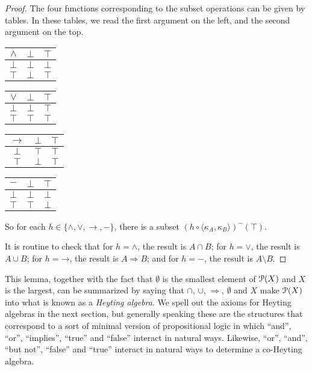 \begin{lemma}
\begin{proof}
		The four functions corresponding to the subset operations can be given by tables. In these tables, we read the first argument on the left, and the second argument on the top.
		\begin{center}
			\begin{tabular}{ c|| c | c |}
				$\wedge$ & $\bot$ & $\top$ \\
				\hline\hline
				$\bot$ & $\bot$ & $\bot$ \\ 
				\hline
				$\top$ & $\bot$ & $\top$ \\ 
				\hline
			\end{tabular}
			\qquad
			\begin{tabular}{ c|| c | c |}
				$\vee$ & $\bot$ & $\top$ \\
				\hline\hline
				$\bot$ & $\bot$ & $\top$ \\ 
				\hline
				$\top$ & $\top$ & $\top$ \\ 
				\hline
			\end{tabular} 
			\qquad
			\begin{tabular}{ c|| c | c |}
				$\to$ & $\bot$ & $\top$ \\
				\hline\hline
				$\bot$ & $\top$ & $\top$ \\ 
				\hline
				$\top$ & $\bot$ & $\top$ \\ 
				\hline
			\end{tabular} 
			\qquad
			\begin{tabular}{ c|| c | c |}
				$-$ & $\bot$ & $\top$ \\
				\hline\hline
				$\bot$ & $\bot$ & $\bot$ \\ 
				\hline
				$\top$ & $\top$ & $\bot$ \\ 
				\hline
			\end{tabular} 
			
		\end{center}
	
		So for each $h \in \{\wedge,\vee,\to,-\}$, there  is a subset $(h\circ\langle \kappa_A,\kappa_B\rangle)^-(\top)$.
		
		It is routine to check that for $h=\mathord\wedge$, the result is $A\cap B$;
		for $h=\mathord\vee$, the result is $A\cup B$; for $h=\mathord\to$, the result is $A \Rightarrow B$; and for $h=\mathord-$, the result is $A \setminus B$.
	\end{proof}
\end{lemma}

This lemma, together with the fact that $\emptyset$ is the smallest element of ${\mathcal{P}}(X)$ and $X$ is the largest, can be summarized by saying that $\cap$, $\cup$, $\Rightarrow$, $\emptyset$ and $X$ make ${\mathcal{P}}(X)$ into what is known as a \emph{Heyting algebra}. 
We spell out the axioms for Heyting algebras in the next section, but generally speaking these are the structures that correspond to a sort of minimal version of propositional logic in which ``and'', ``or'', ``implies'', ``true'' and ``false'' interact in natural ways. Likewise, ``or'', ``and'', ``but not'', ``false'' and ``true'' interact in natural ways to determine a co-Heyting algebra. 

